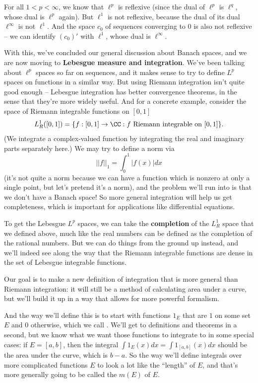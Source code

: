 \begin{example}
For all $1 < p < \infty$, we know that $\ell^p$ is reflexive (since the dual of $\ell^p$ is $\ell^q$, whose dual is $\ell^p$ again). But $\ell^1$ is not reflexive, because the dual of its dual $\ell^{\infty}$ is not $\ell^1$. And the space $c_0$ of sequences converging to $0$ is also not reflexive -- we can identify $(c_0)'$ with $\ell^1$, whose dual is $\ell^{\infty}$.
\end{example}

With this, we've concluded our general discussion about Banach spaces, and we are now moving to \textbf{Lebesgue measure and integration}. We've been talking about $\ell^p$ spaces so far on sequences, and it makes sense to try to define $L^p$ spaces on functions in a similar way. But using Riemann integration isn't quite good enough -- Lebesgue integration has better convergence theorems, in the sense that they're more widely useful. And for a concrete example, consider the space of Riemann integrable functions on $[0, 1]$
\[
    L^1_R([0, 1]) = \{f: [0, 1] \to \CC: f \text{ Riemann integrable on }[0, 1]\}.
\]
(We integrate a complex-valued function by integrating the real and imaginary parts separately here.) We may try to define a norm via 
\[
    ||f||_1 = \int_0^1 |f(x)| dx
\]
(it's not quite a norm because we can have a function which is nonzero at only a single point, but let's pretend it's a norm), and the problem we'll run into is that we don't have a Banach space! So more general integration will help us get completeness, which is important for applications like differential equations.

To get the Lebesgue $L^p$ spaces, we can take the \textbf{completion} of the $L_R^1$ space that we defined above, much like the real numbers can be defined as the completion of the rational numbers. But we can do things from the ground up instead, and we'll indeed see along the way that the Riemann integrable functions are dense in the set of Lebesgue integrable functions.

\begin{fact}
Our goal is to make a new definition of integration that is more general than Riemann integration: it will still be a method of calculating area under a curve, but we'll build it up in a way that allows for more powerful formalism.
\end{fact}

And the way we'll define this is to start with functions $1_E$ that are $1$ on some set $E$ and $0$ otherwise, which we call . We'll get to definitions and theorems in a second, but we know what we want those functions to integrate to in some special cases: if $E = [a, b]$, then the integral $\int 1_E(x) dx = \int 1_{[a, b]}(x) dx$ should be the area under the curve, which is $b-a$. So the way we'll define integrals over more complicated functions $E$ to look a lot like the ``length'' of $E$, and that's more generally going to be called the  $m(E)$ of $E$. 

